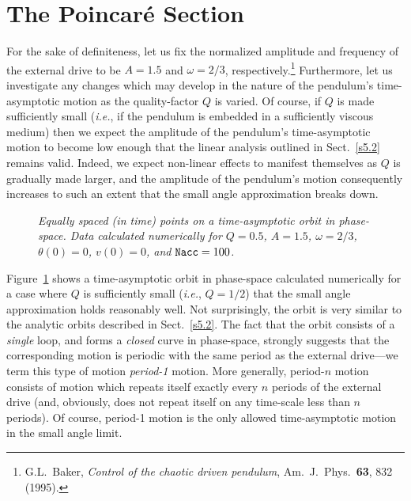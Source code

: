 \section{The Poincar\'{e} Section}
For the sake of definiteness, let us fix the normalized amplitude and frequency of the external
drive to be $A=1.5$ and $\omega=2/3$, respectively.\footnote{G.L.~Baker, {\em Control of
the chaotic driven pendulum},  Am.\ J.\ Phys.\
{\bf 63}, 832 (1995).}
 Furthermore, let us investigate any changes which
may develop in the nature of the
pendulum's time-asymptotic motion
 as the quality-factor $Q$ is varied. Of course, if $Q$ is made sufficiently small 
({\em i.e.}, if the pendulum is embedded in a sufficiently viscous medium) then we expect the
amplitude of the pendulum's time-asymptotic motion to become low enough that the linear analysis
outlined in Sect.~\ref{s5.2} remains valid.  Indeed, we expect non-linear effects to manifest themselves
as $Q$ is gradually made larger, and the amplitude of the pendulum's motion 
consequently increases to such an extent that the
small angle approximation breaks down.


\begin{figure}
\epsfysize=3in
\centerline{}
\caption{\em Equally spaced (in time) points on a time-asymptotic orbit
in phase-space. Data calculated numerically
 for $Q=0.5$, $A=1.5$, $\omega=2/3$, $\theta(0)=0$,
$v(0)=0$, and ${\tt Nacc} = 100$. }\label{f18}
\end{figure}

Figure~\ref{f18} shows a time-asymptotic orbit in phase-space 
calculated numerically for a case where $Q$ is sufficiently
small ({\em i.e.}, $Q=1/2$) that the small angle approximation holds reasonably well. Not surprisingly,
the orbit is very similar to the analytic orbits
 described in Sect.~\ref{s5.2}. The fact that the orbit consists
of a {\em single} loop, and forms a {\em closed} curve in phase-space,
 strongly suggests that the corresponding
motion is periodic with the same period as the external drive---we term this type of motion
{\em period-1} motion. More generally, period-$n$ motion consists of motion which
repeats itself exactly every $n$ periods of the external drive (and, obviously,
does not repeat itself on any time-scale less than $n$ periods). Of course, period-1 motion
is the only allowed time-asymptotic motion in the small angle limit. 

